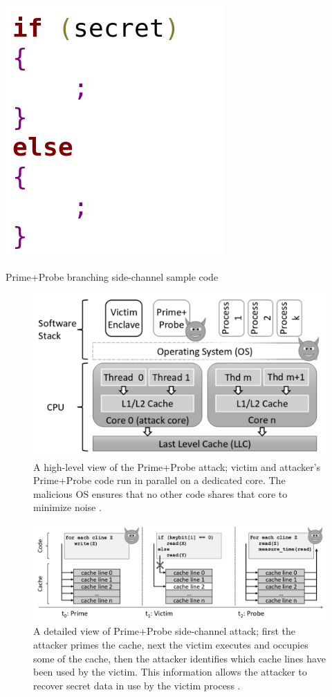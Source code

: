 \begin{algorithm}[t]
	\includegraphics[scale=0.22]{images/alg}
	\caption{Prime+Probe branching side-channel sample code \cite{stealthy,cloak}}
	\label{alg:one}
\end{algorithm}

\begin{figure}
	\includegraphics[scale=0.2]{images/pp1}
	\caption{A high-level view of the Prime+Probe attack; victim and attacker's Prime+Probe code run in parallel on a dedicated core. The malicious OS  ensures  that  no  other  code shares that core to minimize noise \cite{brasser2017software}.}
	\label{fig:ppone}
\end{figure}

\begin{figure}
	\includegraphics[scale=0.2]{images/pp2}
	\caption{A detailed view of Prime+Probe side-channel attack; first the attacker primes the cache, next the victim executes and occupies some of the cache, then the attacker identifies which cache lines have been used by the victim. This information allows the attacker to recover secret data in use by the victim process \cite{brasser2017software}.}
	\label{fig:pptwo}
\end{figure}


